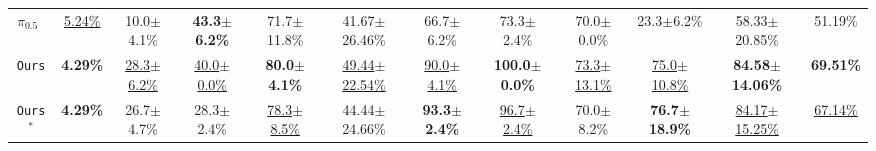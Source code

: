 \begin{table}[H]
\begin{adjustbox}{max width=\textwidth}
\begin{tabular}{cccccc|cccccc}
  $\pi_{0.5}$~\cite{pi05}
  & \underline{5.24\%}
  & 10.0$\pm$4.1\%
  & \textbf{43.3$\pm$6.2\%}
  & 71.7$\pm$11.8\%
  & 41.67$\pm$26.46\%
  & 66.7$\pm$6.2\%
  & 73.3$\pm$2.4\%
  & 70.0$\pm$0.0\%
  & 23.3$\pm$6.2\%
  & 58.33$\pm$20.85\%   & 51.19\% \\

  \rowcolor{hclbrown!8!white}
  \texttt{Ours}
  & \textbf{4.29\%}
  & \underline{28.3$\pm$6.2\%}
  & \underline{40.0$\pm$0.0\%}
  & \textbf{80.0$\pm$4.1\%}
  & \underline{49.44$\pm$22.54\%}
  & \underline{90.0$\pm$4.1\%}
  & \textbf{100.0$\pm$0.0\%}
  & \underline{73.3$\pm$13.1\%}
  & \underline{75.0$\pm$10.8\%}
  & \textbf{84.58$\pm$14.06\%}   & \textbf{69.51\%} \\


  \rowcolor{hclbrown!15!white}
  \texttt{Ours}$^{*}$
  & \textbf{4.29\%}
  & 26.7$\pm$4.7\%
  & 28.3$\pm$2.4\%
  & \underline{78.3$\pm$8.5\%}
  & 44.44$\pm$24.66\%
  & \textbf{93.3$\pm$2.4\%}
  & \underline{96.7$\pm$2.4\%}
  & 70.0$\pm$8.2\%
  & \textbf{76.7$\pm$18.9\%}
  & \underline{84.17$\pm$15.25\%}   & \underline{67.14\%} \\

  \bottomrule
  \end{tabular}
  \end{adjustbox}
\end{table}
